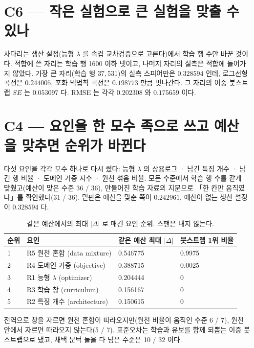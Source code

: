 \section{C6 — 작은 실험으로 큰 실험을 맞출 수 있나}


사다리는 생산 설정(능형 $\lambda$ 를 속겹 교차검증으로 고른다)에서 학습 행 수만 바꾼 것이다. 적합에 쓴 자리는 학습 행 1600 이하 넷이고, 나머지 자리의 실측은 적합에 들어가지 않았다. 가장 큰 자리(학습 행 $37,531$)의 실측 스피어만은 $0.328594$ 인데, 로그선형 곡선은 $0.244005$, 포화 멱법칙 곡선은 $0.198773$ 만큼 빗나간다. 그 자리의 이중 붓스트랩 $SE$ 는 $0.053097$ 다. RMSE 는 각각 $0.202308$ 와 $0.175659$ 이다.

\section{C4 — 요인을 한 모수 족으로 쓰고 예산을 맞추면 순위가 바뀐다}


다섯 요인을 각각 모수 하나로 다시 썼다: 능형 $\lambda$ 의 상용로그 · 남긴 특징 개수 · 남긴 행 비율 · 도메인 가중 지수 · 원천 섞음 비율. 모든 수준에서 학습 행 수를 같게 맞췄고(예산이 맞은 수준 36 / 36), 만들어진 학습 자료의 지문으로 「한 칸만 움직였나」를 확인했다(31 / 36). 밑판은 예산을 맞춘 쪽이 $0.242961$, 예산이 없는 생산 설정이 $0.328594$ 다.

\begin{table}[h]\centering
\begin{tabular}{llll}
\hline
순위 & 요인 & 같은 예산 최대 $|\Delta|$ & 붓스트랩 1위 비율 \\
\hline
1 & R5 원천 혼합 (data mixture) & 0.546775 & 0.9975 \\
2 & R4 도메인 가중 (objective) & 0.388715 & 0.0025 \\
3 & R1 능형 $\lambda$ (optimizer) & 0.204444 & 0 \\
4 & R3 학습 창 (curriculum) & 0.156167 & 0 \\
5 & R2 특징 개수 (architecture) & 0.150615 & 0 \\
\hline
\end{tabular}
\caption{같은 예산에서의 최대 $|\Delta|$ 로 매긴 요인 순위. 스팬은 내지 않는다.}
\end{table}

전역으로 창을 자르면 원천 혼합이 따라오지만(원천 비율이 움직인 수준 6 / 7), 원천 안에서 자르면 따라오지 않는다(5 / 7). 표준오차는 학습과 유보를 함께 되뽑는 이중 붓스트랩으로 냈고, 채택 문턱 둘을 다 넘은 수준은 10 / 32 이다.
